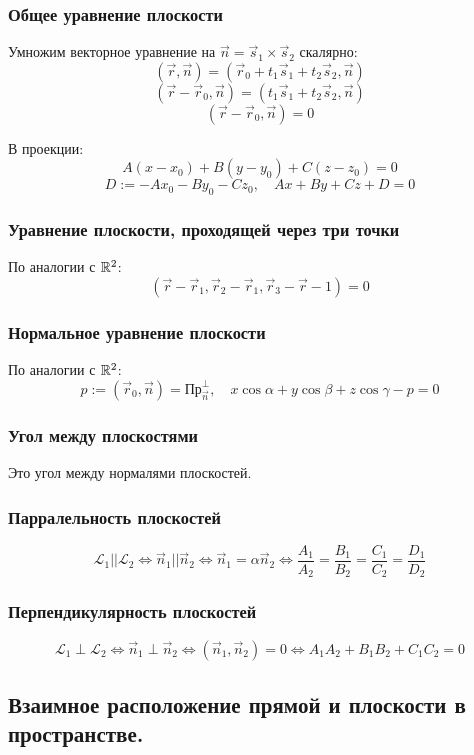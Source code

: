 \subsubsection{Общее уравнение плоскости}
Умножим векторное уравнение на $\vec n=\vec s_1\times\vec s_2$ скалярно:
$$(\vec r, \vec n)=(\vec r_0+t_1\vec s_1+t_2\vec s_2, \vec n)$$
$$(\vec r-\vec r_0, \vec n)=(t_1\vec s_1+t_2\vec s_2, \vec n)$$
$$(\vec r-\vec r_0, \vec n)=0$$

В проекции:
$$A(x-x_0)+B(y-y_0)+C(z-z_0)=0$$
$$D:=-Ax_0-By_0-Cz_0, \quad Ax+By+Cz+D=0$$

\subsubsection{Уравнение плоскости, проходящей через три точки}
По аналогии с $\mathbb{R}^2$:
$$(\vec r-\vec r_1,\vec r_2-\vec r_1,\vec r_3-\vec r-1)=0$$

\subsubsection{Нормальное уравнение плоскости}
По аналогии с $\mathbb{R}^2$:
$$p:=(\vec r_0, \vec n)=\text{Пр}^\perp_{\vec n},\quad x\cos\alpha+y\cos\beta+z\cos\gamma-p=0$$

\subsubsection{Угол между плоскостями}
Это угол между нормалями плоскостей.

\subsubsection{Парралельность плоскостей}
$$\mathcal L_1||\mathcal L_2\Leftrightarrow \vec n_1||\vec n_2\Leftrightarrow \vec n_1=\alpha\vec n_2\Leftrightarrow \frac{A_1}{A_2}=\frac{B_1}{B_2}=\frac{C_1}{C_2}=\frac{D_1}{D_2}$$

\subsubsection{Перпендикулярность плоскостей}
$$\mathcal L_1\perp \mathcal L_2\Leftrightarrow \vec n_1\perp\vec n_2\Leftrightarrow (\vec n_1,\vec n_2)=0\Leftrightarrow A_1A_2+B_1B_2+C_1C_2=0$$

\subsection{Взаимное расположение прямой и плоскости в пространстве.}
